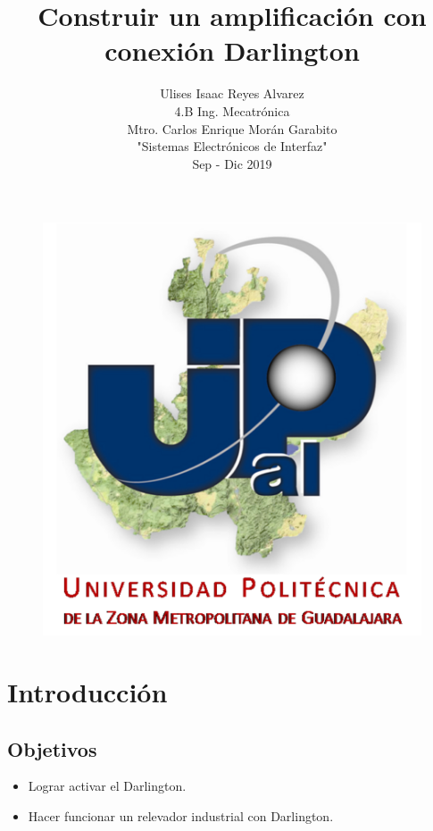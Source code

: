 \documentclass[10pt,a4paper]{article}
\author{Ulises Isaac Reyes Alvarez\\4.B Ing. Mecatrónica\\Mtro. Carlos Enrique Morán Garabito\\"Sistemas Electrónicos de Interfaz"\\ Sep - Dic 2019}
\title{Construir un amplificación con conexión Darlington}
\begin{document}
\maketitle
\begin{figure}[hbtp]
\centering
\includegraphics[scale=2]{Pictures/UPZMG.png}
\end{figure}

\newpage
\section{Introducción}
\subsection*{Objetivos}
\begin{itemize}
\item Lograr activar el Darlington.
\item Hacer funcionar un relevador industrial con Darlington. 
\end{itemize}
\end{document}

